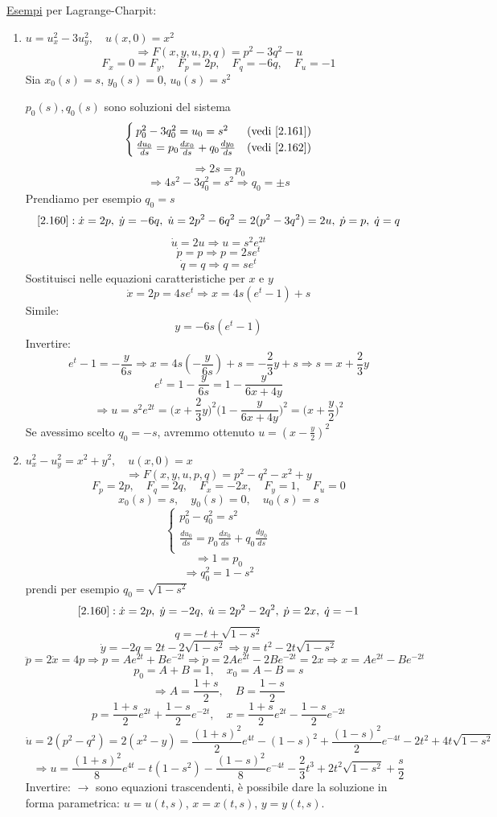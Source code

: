 \documentclass[a4paper,11pt]{report}
\begin{document}
\underline{Esempi} per Lagrange-Charpit:
\begin{enumerate}[label=(\roman*)]
\item $u=u_x^2 - 3u_y^2, \quad u(x,0)=x^2$
\[
\Rightarrow F(x,y,u,p,q)=p^2-3q^2-u
\]
\[
F_x=0=F_y, \quad F_p=2p, \quad F_q=-6q, \quad F_u = -1
\]
Sia $x_0(s)=s$, $y_0(s)=0$, $u_0(s)=s^2$

$p_0(s),q_0(s)$ sono soluzioni del sistema
\[
\begin{cases}
p_0^2 - 3q_0^2=u_0=s^2 & \text{(vedi \eqref{2.161})} \\
\frac{du_0}{ds}=p_0 \frac{dx_0}{ds}+q_0\frac{dy_0}{ds} & \text{(vedi \eqref{2.162})}
\end{cases}
\]
\[
\Rightarrow 2s=p_0
\]
\[
\Rightarrow 4s^2 - 3q_0^2 = s^2 \Rightarrow q_0=\pm s
\]
Prendiamo per esempio $q_0=s$
\[
\eqref{2.160}: \dot{x}=2p,\; \dot{y}=-6q,\; \dot{u}=2p^2 - 6q^2 = 2(p^2-3q^2)=2u,\; \dot{p}=p,\; \dot{q}=q
\]
\[
\dot{u}=2u \Rightarrow u=s^2e^{2t}
\]
\[
\dot{p}=p \Rightarrow p=2se^t
\]
\[
\dot{q}=q \Rightarrow q=se^t
\]
Sostituisci nelle equazioni caratteristiche per $x$ e $y$
\[
\dot{x}=2p=4se^t \Rightarrow x= 4s(e^t -1) +s
\]
Simile:
\[
y=-6s(e^t -1)
\]
Invertire:
\[
e^t-1=-\frac{y}{6s} \Rightarrow x=4s\left(-\frac{y}{6s}\right) + s=-\frac{2}{3}y + s \Rightarrow s=x+\frac{2}{3}y
\]
\[
e^t=1-\frac{y}{6s}=1-\frac{y}{6x+4y} 
\]
\[
\Rightarrow u=s^2 e^{2t}= \Big(x+\frac{2}{3}y\Big)^2\Big(1-\frac{y}{6x+4y}\Big)^2=\Big(x+\frac{y}{2}\Big)^2
\]
Se avessimo scelto $q_0=-s$, avremmo ottenuto $u=\left(x-\frac{y}{2}\right)^2$

\item $u_x^2 - u_y^2 = x^2 + y^2, \quad u(x,0)=x$
\[
\Rightarrow F(x,y,u,p,q) = p^2 - q^2 - x^2 + y
\]
\[
F_p=2p,\quad F_q=2q,\quad F_x = -2x,\quad F_y=1,\quad F_u=0
\]
\[
x_0(s)=s,\quad y_0(s)=0,\quad u_0(s)=s 
\]
\[
\begin{cases}
p_0^2 - q_0^2 = s^2 \\
\frac{du_0}{ds}=p_0\frac{dx_0}{ds}+q_0\frac{dy_0}{ds} \\
\end{cases}
\]
\[
\Rightarrow 1=p_0
\]
\[
\Rightarrow q_0^2=1-s^2
\]
prendi per esempio $q_0=\sqrt{1-s^2}$
\[
\eqref{2.160}: \dot{x}=2p,\; \dot{y}=-2q,\; \dot{u}=2p^2 - 2q^2,\; \dot{p}=2x,\; \dot{q}=-1
\]
\[
q=-t+\sqrt{1-s^2}
\]
\[
\dot{y}=-2q=2t-2\sqrt{1-s^2} \Rightarrow y= t^2-2t\sqrt{1-s^2}
\]
\[
\ddot{p}=2\dot{x}=4p \Rightarrow p=Ae^{2t} + Be^{-2t} \Rightarrow \dot{p}=2Ae^{2t}-2Be^{-2t}=2x \Rightarrow x=Ae^{2t}-Be^{-2t}
\]
\[
p_0=A+B=1, \quad x_0=A-B=s 
\]
\[
\Rightarrow A=\frac{1+s}{2}, \quad B=\frac{1-s}{2}
\]
\[
p=\frac{1+s}{2}e^{2t}+\frac{1-s}{2}e^{-2t}, \quad x=\frac{1+s}{2}e^{2t}-\frac{1-s}{2}e^{-2t}
\]
\[
\dot{u}=2(p^2-q^2)=2(x^2-y) = \frac{(1+s)^2}{2}e^{4t} - (1-s)^2+\frac{(1-s)^2}{2}e^{-4t}-2t^2 + 4t\sqrt{1-s^2}
\]
\[
\Rightarrow u=\frac{(1+s)^2}{8}e^{4t} - t(1-s^2) - \frac{(1-s)^2}{8}e^{-4t}-\frac{2}{3}t^3 + 2t^2\sqrt{1-s^2}+\frac{s}{2}
\]
Invertire: $\rightarrow$ sono equazioni trascendenti, \`e possibile dare la soluzione in forma parametrica: $u=u(t,s)$, $x=x(t,s)$, $y=y(t,s)$.


\end{enumerate}
\end{document}
